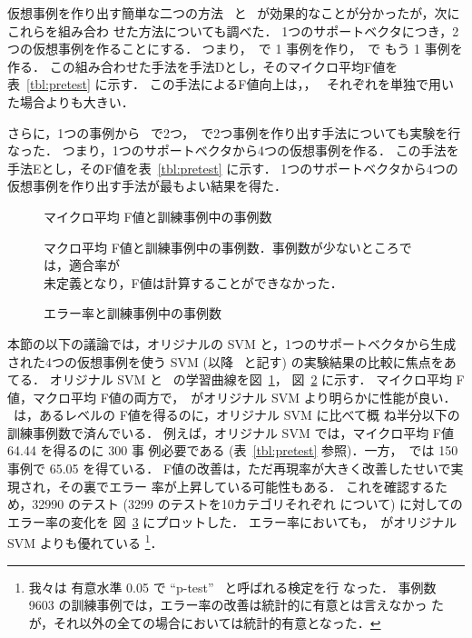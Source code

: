 仮想事例を作り出す簡単な二つの方法 \GenerateByDeletion\ と
\GenerateByAddition\ が効果的なことが分かったが，次にこれらを組み合わ
せた方法についても調べた．
1つのサポートベクタにつき，2つの仮想事例を作ることにする．
つまり，\GenerateByDeletion\ で 1 事例を作り，\GenerateByAddition\ で
もう 1 事例を作る．
この組み合わせた手法を手法Dとし，そのマイクロ平均F値を
表~\ref{tbl:pretest} に示す．
この手法によるF値向上は，\GenerateByDeletion{}，
\GenerateByAddition\ それぞれを単独で用いた場合よりも大きい．

さらに，1つの事例から \GenerateByDeletion\ で2つ，\GenerateByAddition\ 
で2つ事例を作り出す手法についても実験を行なった．
つまり，1つのサポートベクタから4つの仮想事例を作る．
この手法を手法Eとし，そのF値を表~\ref{tbl:pretest} に示す．
1つのサポートベクタから4つの仮想事例を作り出す手法が最もよい結果を得た．


\begin{figure}
\begin{center}
\end{center}
\caption{マイクロ平均 F値と訓練事例中の事例数}\label{fig:micro-f1}
\end{figure}
\begin{figure}
\begin{center}
\end{center}
\caption{マクロ平均 F値と訓練事例中の事例数．事例数が少ないところで
は，適合率が\\
未定義となり，F値は計算することができなかった．}
\label{fig:macro-f1}
\end{figure}

\begin{figure}
\begin{center}
\end{center}
\caption{エラー率と訓練事例中の事例数}\label{fig:error}
\end{figure}


本節の以下の議論では，オリジナルの SVM と，1つのサポートベクタから生成
された4つの仮想事例を使う SVM (以降 \SVMFourVSVs\ と記す) の実験結果の比較に焦点をあてる．
オリジナル SVM と \SVMFourVSVs\ の学習曲線を図~\ref{fig:micro-f1}，
図~\ref{fig:macro-f1} に示す．
マイクロ平均 F値，マクロ平均 F値の両方で，\SVMFourVSVs\ がオリジナル 
SVM より明らかに性能が良い．
\SVMFourVSVs\ は，あるレベルの F値を得るのに，オリジナル SVM に比べて概
ね半分以下の訓練事例数で済んでいる．
例えば，オリジナル SVM では，マイクロ平均 F値 64.44 を得るのに 300 事
例必要である (表~\ref{tbl:pretest} 参照)．一方，\SVMFourVSVs\ では 150 
事例で 65.05 を得ている．
F値の改善は，ただ再現率が大きく改善したせいで実現され，その裏でエラー
率が上昇している可能性もある．
これを確認するため，32990 のテスト (3299 のテストを10カテゴリそれぞれ
について) に対してのエラー率の変化を
図~\ref{fig:error} にプロットした．
エラー率においても，\SVMFourVSVs\ がオリジナル SVM よりも優れている
\footnote{
我々は 有意水準 0.05 で ``p-test''~\cite{Yang1999} と呼ばれる検定を行
なった．
事例数 9603 の訓練事例では，エラー率の改善は統計的に有意とは言えなかっ
たが，それ以外の全ての場合においては統計的有意となった．
}．

